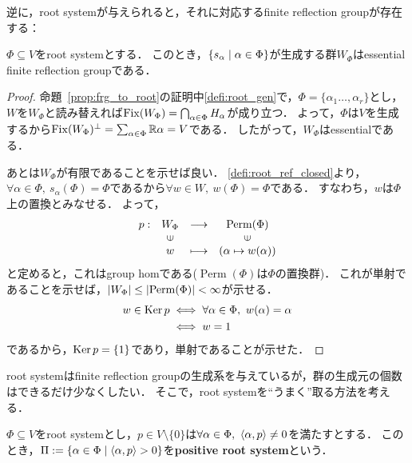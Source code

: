 逆に，root systemが与えられると，それに対応するfinite reflection groupが存在する：
\begin{prop}
  $\Phi \subseteq V$をroot systemとする．
  このとき，$\left\lbrace s_\alpha \mathrel{} \middle| \mathrel{} \alpha \in \Phi \right\rbrace$が生成する群$W_\Phi$はessential finite reflection groupである．
\end{prop}
\begin{proof}
  命題~\ref{prop:frg_to_root}の証明中\ref{defi:root_gen}で，$\Phi = \{\alpha_1 \ldots, \alpha_r\}$とし，$W$を$W_\Phi$と読み替えれば$\operatorname{Fix}(W_\Phi) = \bigcap_{\alpha \in \Phi} H_\alpha$が成り立つ．
  よって，$\Phi$は$V$を生成するから$\operatorname{Fix}(W_\Phi)^\perp = \sum_{\alpha \in \Phi} \mathbb{R}\alpha = V$である．
  したがって，$W_\Phi$はessentialである．

  あとは$W_\Phi$が有限であることを示せば良い．
  \ref{defi:root_ref_closed}より，$\forall \alpha \in \Phi,\ s_\alpha(\Phi) = \Phi$であるから$\forall w \in W,\ w(\Phi) = \Phi$である．
  すなわち，$w$は$\Phi$上の置換とみなせる．
  よって，
  \begin{equation}
    \begin{array}{rccc}
    p:&W_\Phi & \longrightarrow & \operatorname{Perm}(\Phi) \\
    &\rotatebox[origin=c]{90}{$\in$} & & \rotatebox[origin=c]{90}{$\in$} \\
    &w & \longmapsto & (\alpha \mapsto w(\alpha))
    \end{array}
  \end{equation}
  と定めると，これはgroup homである($\operatorname{Perm}(\Phi)$は$\Phi$の置換群)．
  これが単射であることを示せば，$\left| W_\Phi \right| \le \left| \operatorname{Perm}(\Phi) \right| < \infty$が示せる．
  \begin{align}
    w \in \operatorname{Ker} p
    &\iff \forall \alpha \in \Phi,\ w(\alpha) = \alpha\\
    &\iff w = 1
  \end{align}
  であるから，$\operatorname{Ker} p = \{1\}$であり，単射であることが示せた．
\end{proof}

root systemはfinite reflection groupの生成系を与えているが，群の生成元の個数はできるだけ少なくしたい．
そこで，root systemを``うまく''取る方法を考える．

\begin{defi}
  $\Phi \subseteq V$をroot systemとし，$p \in V \setminus \{0\}$は$\forall \alpha \in \Phi,\ \left\langle \alpha, p \right\rangle \ne 0$を満たすとする．
  このとき，$\Pi := \left\lbrace \alpha \in \Phi \mathrel{} \middle| \mathrel{} \left\langle \alpha, p \right\rangle > 0 \right\rbrace$を\textbf{positive root system}という．
\end{defi}

